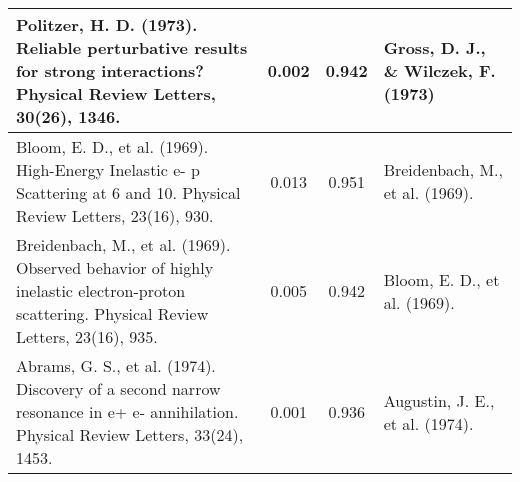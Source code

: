\documentclass[12pt]{article}
\begin{document}
\begin{refsection}
\begin{table}
\begin{tabularx}{\linewidth}{|p{7 cm}|c|c|p{4 cm}}
    Politzer, H. D. (1973). Reliable perturbative results for strong interactions? Physical Review Letters, 30(26), 1346. &0.002 &  0.942 &Gross, D. J., \& Wilczek, F. (1973)\\ 
       \hline
        Bloom, E. D., et al. (1969). High-Energy Inelastic e- p Scattering at 6 and 10. Physical Review Letters, 23(16), 930. & 0.013 & 0.951&Breidenbach, M., et al. (1969).\\ 
    
    \hline
        Breidenbach, M., et al. (1969). Observed behavior of highly inelastic electron-proton scattering. Physical Review Letters, 23(16), 935. & 0.005 &0.942 & Bloom, E. D., et al. (1969). \\ 
    \hline
    Abrams, G. S., et al. (1974). Discovery of a second narrow resonance in e+ e- annihilation. Physical Review Letters, 33(24), 1453. &0.001 & 0.936& Augustin, J. E., et al. (1974).\\ 
    \hline
\bottomrule
    \end{tabularx}
\end{table}



  
\newpage


\printbibliography[heading=subbibliography, title={Supplementary Information References}]
\end{refsection}
\end{document}
